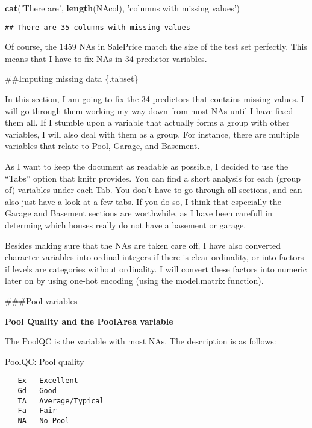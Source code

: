 \documentclass[]{article}
\newenvironment{Shaded}{\begin{snugshade}}{\end{snugshade}}
\newcommand{\KeywordTok}[1]{\textcolor[rgb]{0.13,0.29,0.53}{\textbf{#1}}}
\newcommand{\NormalTok}[1]{#1}
\newcommand{\StringTok}[1]{\textcolor[rgb]{0.31,0.60,0.02}{#1}}
\begin{document}
\begin{Shaded}
\begin{Highlighting}[]
\KeywordTok{cat}\NormalTok{(}\StringTok{'There are'}\NormalTok{, }\KeywordTok{length}\NormalTok{(NAcol), }\StringTok{'columns with missing values'}\NormalTok{)}
\end{Highlighting}
\end{Shaded}

\begin{verbatim}
## There are 35 columns with missing values
\end{verbatim}

Of course, the 1459 NAs in SalePrice match the size of the test set
perfectly. This means that I have to fix NAs in 34 predictor variables.

\#\#Imputing missing data \{.tabset\}

In this section, I am going to fix the 34 predictors that contains
missing values. I will go through them working my way down from most NAs
until I have fixed them all. If I stumble upon a variable that actually
forms a group with other variables, I will also deal with them as a
group. For instance, there are multiple variables that relate to Pool,
Garage, and Basement.

As I want to keep the document as readable as possible, I decided to use
the ``Tabs'' option that knitr provides. You can find a short analysis
for each (group of) variables under each Tab. You don't have to go
through all sections, and can also just have a look at a few tabs. If
you do so, I think that especially the Garage and Basement sections are
worthwhile, as I have been carefull in determing which houses really do
not have a basement or garage.

Besides making sure that the NAs are taken care off, I have also
converted character variables into ordinal integers if there is clear
ordinality, or into factors if levels are categories without ordinality.
I will convert these factors into numeric later on by using one-hot
encoding (using the model.matrix function).

\#\#\#Pool variables

\textbf{Pool Quality and the PoolArea variable}

The PoolQC is the variable with most NAs. The description is as follows:

PoolQC: Pool quality

\begin{verbatim}
   Ex   Excellent
   Gd   Good
   TA   Average/Typical
   Fa   Fair
   NA   No Pool
   
\end{verbatim}
\end{document}
